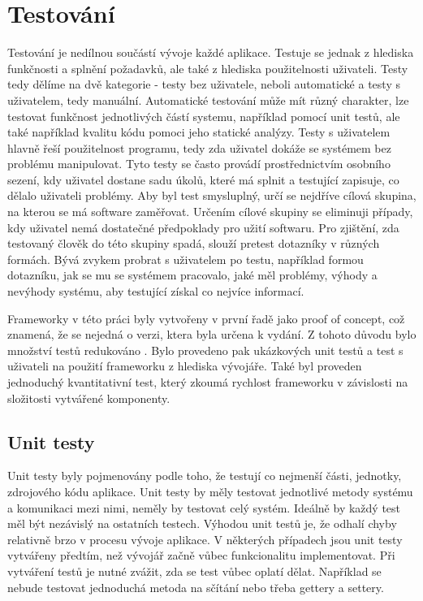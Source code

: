 \chapter{Testování} 
Testování je nedílnou součástí vývoje každé aplikace. Testuje se jednak z hlediska funkčnosti a splnění požadavků, ale také z hlediska použitelnosti uživateli. Testy tedy dělíme na dvě kategorie - testy bez uživatele, neboli automatické a testy s uživatelem, tedy manuální.  Automatické testování může mít různý charakter, lze testovat funkčnost jednotlivých částí systemu, například pomocí unit testů, ale také například kvalitu kódu pomoci jeho statické analýzy. Testy s uživatelem hlavně řeší použitelnost programu, tedy zda uživatel dokáže se systémem bez problému manipulovat. Tyto testy se často provádí prostřednictvím osobního sezení, kdy uživatel dostane sadu úkolů, které má splnit a testující zapisuje, co dělalo uživateli problémy. Aby byl test smysluplný, určí se nejdříve cílová skupina, na kterou se má software zaměřovat. Určením cílové skupiny se eliminuji případy, kdy uživatel nemá dostatečné předpoklady pro užití softwaru. Pro zjištění, zda testovaný člověk do této skupiny spadá, slouží pretest dotazníky v různých formách. Bývá zvykem probrat s uživatelem po testu, například formou dotazníku, jak se mu se systémem pracovalo, jaké měl problémy, výhody a nevýhody systému, aby testující získal co nejvíce informací.  

Frameworky v této práci byly vytvořeny v první řadě jako proof of concept, což znamená, že se nejedná o verzi, ktera byla určena k vydání. Z tohoto důvodu bylo množství testů redukováno . Bylo provedeno pak ukázkových unit testů a test s uživateli na použití frameworku z hlediska vývojáře. Také byl proveden jednoduchý kvantitativní test, který zkoumá rychlost frameworku v závislosti na složitosti vytvářené komponenty.

\section{Unit testy} 
Unit testy byly pojmenovány podle toho, že testují co nejmenší části, jednotky, zdrojového kódu aplikace. Unit testy by měly testovat jednotlivé metody systému a komunikaci mezi nimi, neměly by testovat celý systém. Ideálně by každý test měl být nezávislý na ostatních testech. Výhodou unit testů je, že odhalí chyby relativně brzo v procesu vývoje aplikace. V některých případech jsou unit testy vytvářeny předtím, než vývojář začně vůbec funkcionalitu implementovat. Při vytváření testů je nutné zvážit, zda se test vůbec oplatí dělat. Například se nebude testovat jednoduchá metoda na sčítání nebo třeba gettery a settery.

